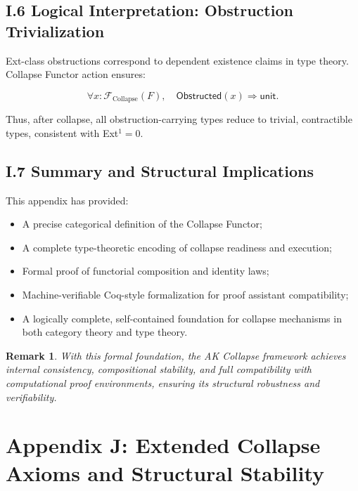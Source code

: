 \documentclass[11pt]{article}
\newtheorem{remark}[theorem]{Remark}
\begin{document}
\subsection*{I.6 Logical Interpretation: Obstruction Trivialization}

Ext-class obstructions correspond to dependent existence claims in type theory. Collapse Functor action ensures:

\[
\forall x : \mathcal{F}_{\mathrm{Collapse}}(F), \quad \mathsf{Obstructed}(x) \Rightarrow \mathsf{unit}.
\]

Thus, after collapse, all obstruction-carrying types reduce to trivial, contractible types, consistent with Ext$^1 = 0$.

\subsection*{I.7 Summary and Structural Implications}

This appendix has provided:

\begin{itemize}
    \item A precise categorical definition of the Collapse Functor;
    \item A complete type-theoretic encoding of collapse readiness and execution;
    \item Formal proof of functorial composition and identity laws;
    \item Machine-verifiable Coq-style formalization for proof assistant compatibility;
    \item A logically complete, self-contained foundation for collapse mechanisms in both category theory and type theory.
\end{itemize}

\begin{remark}
With this formal foundation, the AK Collapse framework achieves internal consistency, compositional stability, and full compatibility with computational proof environments, ensuring its structural robustness and verifiability.
\end{remark}



\section*{Appendix J: Extended Collapse Axioms and Structural Stability}
\end{document}

